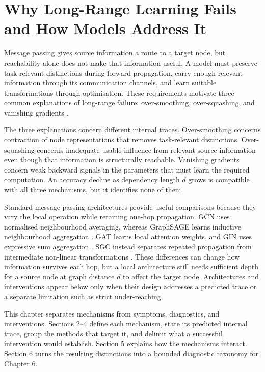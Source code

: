 \chapter{Why Long-Range Learning Fails and How Models Address It}

Message passing gives source information a route to a target node, but reachability alone does not make that information useful.
A model must preserve task-relevant distinctions during forward propagation, carry enough relevant information through its communication channels, and learn suitable transformations through optimisation.
These requirements motivate three common explanations of long-range failure: over-smoothing, over-squashing, and vanishing gradients \cite{li2018deeper,alon2021bottleneck,glorot2010difficulty}.

The three explanations concern different internal traces.
Over-smoothing concerns contraction of node representations that removes task-relevant distinctions.
Over-squashing concerns inadequate usable influence from relevant source information even though that information is structurally reachable.
Vanishing gradients concern weak backward signals in the parameters that must learn the required computation.
An accuracy decline as dependency length $d$ grows is compatible with all three mechanisms, but it identifies none of them.

Standard message-passing architectures provide useful comparisons because they vary the local operation while retaining one-hop propagation.
GCN uses normalised neighbourhood averaging, whereas GraphSAGE learns inductive neighbourhood aggregation \cite{kipf2017semi,hamilton2017graphsage}.
GAT learns local attention weights, and GIN uses expressive sum aggregation \cite{velickovic2018gat,xu2019gin}.
SGC instead separates repeated propagation from intermediate non-linear transformations \cite{wu2019sgc}.
These differences can change how information survives each hop, but a local architecture still needs sufficient depth for a source node at graph distance $d$ to affect the target node.
Architectures and interventions appear below only when their design addresses a predicted trace or a separate limitation such as strict under-reaching.

This chapter separates mechanisms from symptoms, diagnostics, and interventions.
Sections 2--4 define each mechanism, state its predicted internal trace, group the methods that target it, and delimit what a successful intervention would establish.
Section 5 explains how the mechanisms interact.
Section 6 turns the resulting distinctions into a bounded diagnostic taxonomy for Chapter 6.

